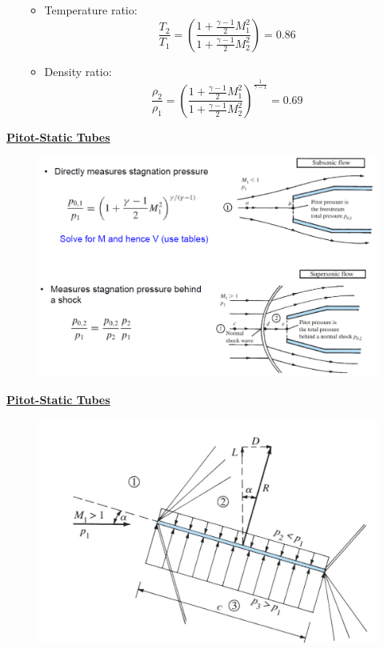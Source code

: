 \begin{itemize}
\begin{itemize}
\begin{equation*}
        \end{equation*}
        \item Temperature ratio:
        \begin{equation*}
            \frac{T_2}{T_1} = \left(\frac{1+\frac{\gamma-1}{2}M_1^2}{1+\frac{\gamma-1}{2}M_2^2}\right)= 0.86
        \end{equation*}
        \item Density ratio:
        \begin{equation*}
            \frac{\rho_2}{\rho_1} = \left(\frac{1+\frac{\gamma-1}{2}M_1^2}{1+\frac{\gamma-1}{2}M_2^2}\right)^{\frac{1}{\gamma-1}}= 0.69
        \end{equation*}
    \end{itemize}
\end{itemize}

\large \textbf{\underline{{\color{red}Pitot-Static Tubes}}}
\begin{figure}[H]
    \centering
    \includegraphics[width=1.0\linewidth]{images/Pitot_static_tubes.png}
\end{figure}

\large \textbf{\underline{{\color{red}Pitot-Static Tubes}}}
\begin{figure}[H]
    \centering
    \includegraphics[width=1.0\linewidth]{images/Compressible_Aerodynamics.png}
\end{figure}

